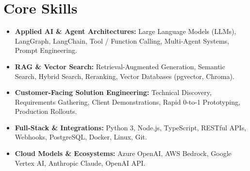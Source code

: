 \documentclass[a4paper,10pt]{article}
\begin{document}
\section{Core Skills}
\begin{itemize}
  \item \textbf{Applied AI \& Agent Architectures:} Large Language Models (LLMs), LangGraph, LangChain, Tool / Function Calling, Multi-Agent Systems, Prompt Engineering.
  \item \textbf{RAG \& Vector Search:} Retrieval-Augmented Generation, Semantic Search, Hybrid Search, Reranking, Vector Databases (pgvector, Chroma).
  \item \textbf{Customer-Facing Solution Engineering:} Technical Discovery, Requirements Gathering, Client Demonstrations, Rapid 0-to-1 Prototyping, Production Rollouts.
  \item \textbf{Full-Stack \& Integrations:} Python 3, Node.js, TypeScript, RESTful APIs, Webhooks, PostgreSQL, Docker, Linux, Git.
  \item \textbf{Cloud Models \& Ecosystems:} Azure OpenAI, AWS Bedrock, Google Vertex AI, Anthropic Claude, OpenAI API.
\end{itemize}
\end{document}
